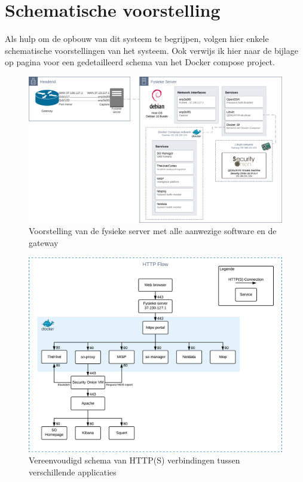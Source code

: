 \documentclass[a4paper, 12pt]{report}
\begin{document}
\section{Schematische voorstelling}
Als hulp om de opbouw van dit systeem te begrijpen, volgen hier enkele schematische voorstellingen van het systeem.
Ook verwijs ik hier naar de bijlage op pagina \pageref{bijlage:aangepast-systeem-schema-docker} voor een gedetailleerd schema van het Docker compose project.

\begin{figure}[H]
  \centering
  \includegraphics[width=\textwidth]{aangepast-systeem-schema-server}
  \caption{Voorstelling van de fysieke server met alle aanwezige software en de gateway}
  \label{fig:aangepast-systeem-schema-server}
\end{figure}

\begin{figure}[H]
  \centering
  \includegraphics[width=\textwidth]{aangepast-systeem-schema-http}
  \caption{Vereenvoudigd schema van HTTP(S) verbindingen tussen verschillende applicaties}
  \label{fig:aangepast-systeem-schema-http}
\end{figure}
\end{document}
